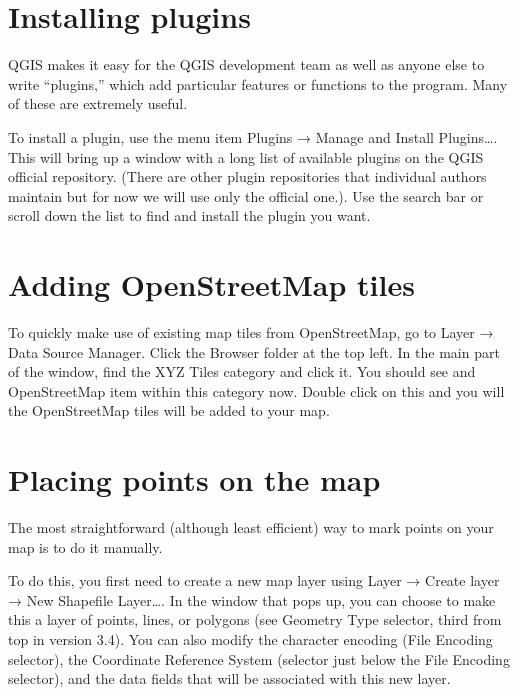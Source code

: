 \documentclass[]{book}
\begin{document}
\hypertarget{installing-plugins}{%
\section{Installing plugins}\label{installing-plugins}}

QGIS makes it easy for the QGIS development team as well as anyone else to write ``plugins,'' which add particular features or functions to the program. Many of these are extremely useful.

To install a plugin, use the menu item Plugins → Manage and Install Plugins\ldots{}. This will bring up a window with a long list of available plugins on the QGIS official repository. (There are other plugin repositories that individual authors maintain but for now we will use only the official one.). Use the search bar or scroll down the list to find and install the plugin you want.

\hypertarget{osm-tiles}{%
\section{Adding OpenStreetMap tiles}\label{osm-tiles}}

To quickly make use of existing map tiles from OpenStreetMap, go to Layer → Data Source Manager. Click the Browser folder at the top left. In the main part of the window, find the XYZ Tiles category and click it. You should see and OpenStreetMap item within this category now. Double click on this and you will the OpenStreetMap tiles will be added to your map.

\hypertarget{placing-points-on-the-map}{%
\section{Placing points on the map}\label{placing-points-on-the-map}}

The most straightforward (although least efficient) way to mark points on your map is to do it manually.

To do this, you first need to create a new map layer using Layer → Create layer → New Shapefile Layer\ldots{}. In the window that pops up, you can choose to make this a layer of points, lines, or polygons (see Geometry Type selector, third from top in version 3.4). You can also modify the character encoding (File Encoding selector), the Coordinate Reference System (selector just below the File Encoding selector), and the data fields that will be associated with this new layer.
\end{document}
